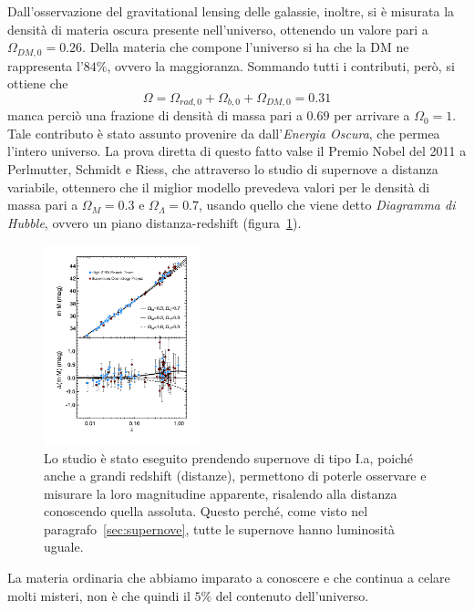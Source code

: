 Dall'osservazione del gravitational lensing delle galassie, inoltre, si è misurata la densità di materia oscura presente nell'universo, ottenendo un valore pari a $\Omega_{DM,0} = 0.26$. Della materia che compone l'universo si ha che la DM ne rappresenta l'$84\%$, ovvero la maggioranza. Sommando tutti i contributi, però, si ottiene che
\[
    \Omega = \Omega_{rad,0} + \Omega_{b,0} + \Omega_{DM,0} = 0.31
\]
manca perciò una frazione di densità di massa pari a $0.69$ per arrivare a $\Omega_0 = 1$. Tale contributo è stato assunto provenire da dall'\emph{Energia Oscura}, che permea l'intero universo. La prova diretta di questo fatto valse il Premio Nobel del 2011 a Perlmutter, Schmidt e Riess, che attraverso lo studio di supernove a distanza variabile, ottennero che il miglior modello prevedeva valori per le densità di massa pari a $\Omega_M = 0.3$ e $\Omega_\Lambda = 0.7$, usando quello che viene detto \emph{Diagramma di Hubble}, ovvero un piano distanza-redshift (figura~\ref{fig:diagramma-hubble}).
\begin{figure}
    \centering
    \includegraphics[width=0.4\textwidth]{immagini/hubble_diagram.png}
    \caption{Lo studio è stato eseguito prendendo supernove di tipo I.a, poiché anche a grandi redshift (distanze), permettono di poterle osservare e misurare la loro magnitudine apparente, risalendo alla distanza conoscendo quella assoluta. Questo perché, come visto nel paragrafo~\ref{sec:supernove}, tutte le supernove hanno luminosità uguale.}\label{fig:diagramma-hubble}
\end{figure}

La materia ordinaria che abbiamo imparato a conoscere e che continua a celare molti misteri, non è che quindi il $5\%$ del contenuto dell'universo. 